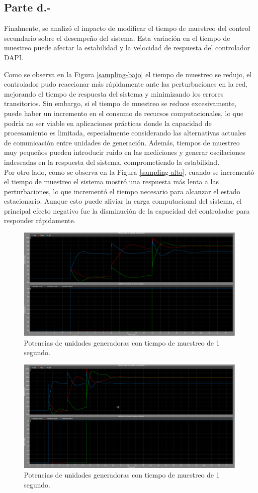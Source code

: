 \subsection{Parte d.-}

Finalmente, se analizó el impacto de modificar el tiempo de muestreo del control secundario sobre el desempeño del sistema. Esta variación en el tiempo de muestreo puede afectar la estabilidad y la velocidad de respuesta del controlador DAPI. 

Como se observa en la Figura \ref{sampling-bajo} el tiempo de muestreo se redujo, el controlador pudo reaccionar más rápidamente ante las perturbaciones en la red, mejorando el tiempo de respuesta del sistema y minimizando los errores transitorios. Sin embargo, si el tiempo de muestreo se reduce excesivamente, puede haber un incremento en el consumo de recursos computacionales, lo que podría no ser viable en aplicaciones prácticas donde la capacidad de procesamiento es limitada, especialmente considerando las alternativas actuales de comunicación entre unidades de generación. Además, tiempos de muestreo muy pequeños pueden introducir ruido en las mediciones y generar oscilaciones indeseadas en la respuesta del sistema, comprometiendo la estabilidad.\\

Por otro lado, como se observa en la Figura \ref{sampling-alto}, cuando se incrementó el tiempo de muestreo el sistema mostró una respuesta más lenta a las perturbaciones, lo que incrementó el tiempo necesario para alcanzar el estado estacionario. Aunque esto puede aliviar la carga computacional del sistema, el principal efecto negativo fue la disminución de la capacidad del controlador para responder rápidamente.


\begin{figure}
    \centering
    \includegraphics[width=0.5\linewidth]{Tarea 2/report/imagenes/p2b/sampling_bajo.png}
    \caption{Potencias de unidades generadoras con tiempo de muestreo de 1 segundo.}
    \label{sampling_bajo}
\end{figure}

\begin{figure}
    \centering
    \includegraphics[width=0.5\linewidth]{Tarea 2/report/imagenes/p2b/sampling_alto.png}
    \caption{Potencias de unidades generadoras con tiempo de muestreo de 1 segundo.}
    \label{sampling_alto}
\end{figure}


